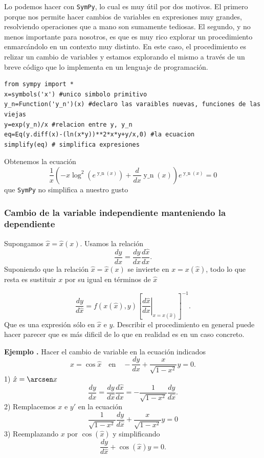 \documentclass{article}
\newcounter{ejemplo_cont}
\newenvironment{ejemplo}{\noindent\textbf{Ejemplo  \arabic{ejemplo_cont}.} }{\addtocounter{ejemplo_cont}{1}}
\begin{document}
Lo podemos hacer con \texttt{SymPy}, lo cual es muy útil por dos motivos. El primero porque nos permite hacer cambios de variables en expresiones muy grandes, resolviendo operaciones que a mano son sumamente tediosas. El segundo, y no menos importante para nosotros, es que es muy rico explorar un procedimiento enmarcándolo en un contexto muy distinto. En este caso, el procedimiento es relizar un cambio de variables y estamos explorando el mismo a través de un breve código que lo implementa en un lenguaje de programación.

\begin{lstlisting}
from sympy import *
x=symbols('x') #unico simbolo primitivo
y_n=Function('y_n')(x) #declaro las varaibles nuevas, funciones de las viejas
y=exp(y_n)/x #relacion entre y, y_n
eq=Eq(y.diff(x)-(ln(x*y))**2*x*y+y/x,0) #la ecuacion
simplify(eq) # simplifica expresiones
\end{lstlisting}
Obtenemos la ecuación
\[\frac{1}{x} \left(- x \log^{2}{\left (e^{\operatorname{y\_n}{\left (x \right )
}} \right )} + \frac{d}{d x} \operatorname{y\_n}{\left (x \right )}\right) e^{
\operatorname{y\_n}{\left (x \right )}} = 0\]
que \texttt{SymPy} no simplifica a nuestro gusto




\subsubsection{Cambio de la variable independiente manteniendo la dependiente}

Supongamos  $\hat{x}=\hat{x}(x)$. Usamos la relación
\[\frac{dy}{dx}=\frac{dy}{d\hat{x}}\frac{d\hat{x}}{dx}.\]
Suponiendo que la relación $\hat{x}=\hat{x}(x)$ se invierte en $x=x(\hat{x})$, todo lo que resta es sustituir  $x$ por su igual en términos de $\hat{x}$

\[\frac{dy}{d\hat{x}}=f(x(\hat{x}),y) \left[\left.\frac{d\hat{x}}{dx}\right|_{x=x(\hat{x})}\right]^{-1}.\]
Que es una expresión sólo en $\hat{x}$ e $y$. Describir el procedimiento  en general puede hacer parecer que es más dificil de lo que en realidad es en un caso concreto.



\begin{ejemplo} Hacer el cambio de variable en la  ecuación indicados
\[x=\cos \hat{x}\quad\text{en}\quad  -\frac{dy}{dx}+\frac{x}{\sqrt{1-x^2}}y=0.\]
1) $\hat{x}=\arcsen x$
\[\frac{dy}{dx}=\frac{dy}{d\hat{x}} \frac{d\hat{x}}{dx}  =-\frac{1}{\sqrt{1-x^2}}\frac{dy}{d\hat{x}}.\]
 2) Remplacemos $x$ e $y'$ en la ecuación
\[\frac{1}{\sqrt{1-x^2}}\frac{dy}{d\hat{x}}+ \frac{x}{\sqrt{1-x^2}}y=0\]
3) Reemplazando $x$ por $\cos(\hat{x})$ y simplificando
\[\frac{dy}{d\hat{x}}+\cos(\hat{x}) y=0.\]

\end{ejemplo}
\end{document}
